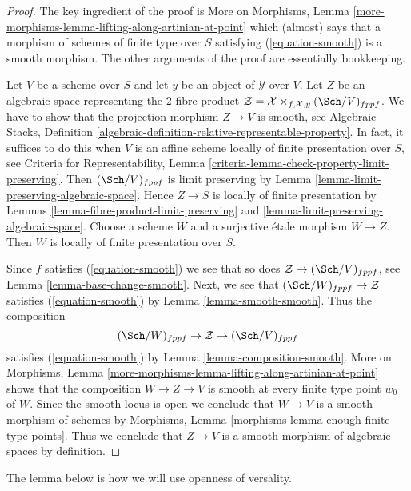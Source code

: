 \begin{proof}
The key ingredient of the proof is More on Morphisms, Lemma
\ref{more-morphisms-lemma-lifting-along-artinian-at-point}
which (almost) says that a morphism of schemes of finite type over $S$
satisfying (\ref{equation-smooth}) is a smooth morphism. The other
arguments of the proof are essentially bookkeeping.

\medskip\noindent
Let $V$ be a scheme over $S$ and let $y$ be an object of $\mathcal{Y}$ over
$V$. Let $Z$ be an algebraic space representing the $2$-fibre product
$\mathcal{Z} = \mathcal{X} \times_{f, \mathcal{X}, y} (\Sch/V)_{fppf}$.
We have to show that the projection morphism $Z \to V$ is smooth, see
Algebraic Stacks, Definition
\ref{algebraic-definition-relative-representable-property}.
In fact, it suffices to do this when $V$ is an affine scheme
locally of finite presentation over $S$, see
Criteria for Representability, Lemma
\ref{criteria-lemma-check-property-limit-preserving}.
Then $(\Sch/V)_{fppf}$ is limit preserving by
Lemma \ref{lemma-limit-preserving-algebraic-space}.
Hence $Z \to S$ is locally of finite presentation by
Lemmas \ref{lemma-fibre-product-limit-preserving} and
\ref{lemma-limit-preserving-algebraic-space}.
Choose a scheme $W$ and a surjective \'etale morphism $W \to Z$.
Then $W$ is locally of finite presentation over $S$.

\medskip\noindent
Since $f$ satisfies (\ref{equation-smooth}) we see that so does
$\mathcal{Z} \to (\Sch/V)_{fppf}$, see Lemma \ref{lemma-base-change-smooth}.
Next, we see that $(\Sch/W)_{fppf} \to \mathcal{Z}$ satisfies
(\ref{equation-smooth}) by Lemma \ref{lemma-smooth-smooth}.
Thus the composition
$$
(\Sch/W)_{fppf} \to \mathcal{Z} \to (\Sch/V)_{fppf}
$$
satisfies (\ref{equation-smooth}) by Lemma \ref{lemma-composition-smooth}.
More on Morphisms, Lemma
\ref{more-morphisms-lemma-lifting-along-artinian-at-point}
shows that the composition $W \to Z \to V$ is smooth at every finite type
point $w_0$ of $W$. Since the smooth locus is open we conclude
that $W \to V$ is a smooth morphism of schemes by
Morphisms, Lemma \ref{morphisms-lemma-enough-finite-type-points}.
Thus we conclude that $Z \to V$ is a smooth morphism
of algebraic spaces by definition.
\end{proof}

\noindent
The lemma below is how we will use openness of versality.

